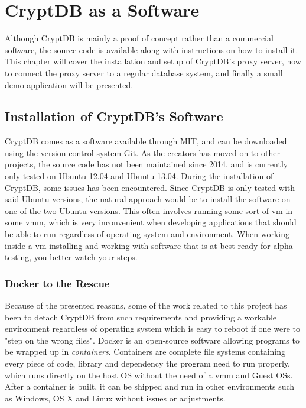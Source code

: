 \chapter{CryptDB as a Software}
\label{chp:software}

Although CryptDB is mainly a proof of concept rather than a commercial software, the source code is available along with instructions on how to install it. This chapter will cover the installation and setup of CryptDB's proxy server, how to connect the proxy server to a regular database system, and finally a small demo application will be presented.

\section{Installation of CryptDB's Software}

CryptDB comes as a software available through MIT, and can be downloaded using the version control system Git. As the creators has moved on to other projects, the source code has not been maintained since 2014, and is currently only tested on Ubuntu 12.04 and Ubuntu 13.04. During the installation of CryptDB, some issues has been encountered. Since CryptDB is only tested with said Ubuntu versions, the natural approach would be to install the software on one of the two Ubuntu versions. This often involves running some sort of \gls{vm} in some \gls{vmm}, which is very inconvenient when developing applications that should be able to run regardless of operating system and environment. When working inside a \gls{vm} installing and working with software that is at best ready for alpha testing, you better watch your steps. 

\subsection{Docker to the Rescue}

Because of the presented reasons, some of the work related to this project has been to detach CryptDB from such requirements and providing a workable environment regardless of operating system which is easy to reboot if one were to "step on the wrong files". Docker \cite{docker_homepage} is an open-source software allowing programs to be wrapped up in \emph{containers}. Containers are complete file systems containing every piece of code, 
library and dependency the program need to run properly, which runs directly on the host OS without the need of a \gls{vmm} and Guest OSs. After a container is built, it can be shipped and run in other environments such as Windows, OS X and Linux without issues or adjustments.

